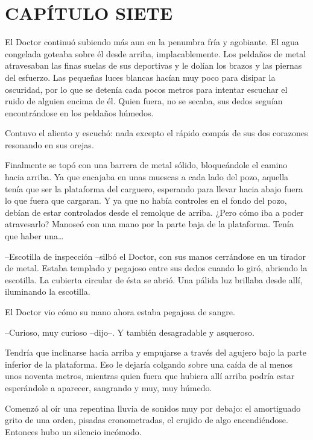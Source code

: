 \chapter*{CAPÍTULO SIETE}

{El Doctor continuó subiendo más aun en la penumbra fría y agobiante. El
 agua congelada goteaba sobre él desde arriba, implacablemente. Los
 peldaños de metal atravesaban las finas suelas de sus deportivas y le
 dolían los brazos y las piernas del esfuerzo. Las pequeñas luces blancas
 hacían muy poco para disipar la oscuridad, por lo que se detenía cada
 pocos metros para intentar escuchar el ruido de alguien encima de él.
 Quien fuera, no se secaba, sus dedos seguían encontrándose en los
peldaños húmedos.}

{Contuvo el aliento y escuchó: nada excepto el rápido compás de sus dos
corazones resonando en sus orejas.}

{Finalmente se topó con una barrera de metal sólido, bloqueándole el
 camino hacia arriba. Ya que encajaba en unas muescas a cada lado del
 pozo, aquella tenía que ser la plataforma del carguero, esperando para
 llevar hacia abajo fuera lo que fuera que cargaran. Y ya que no había
 controles en el fondo del pozo, debían de estar controlados desde el
 remolque de arriba. ¿Pero cómo iba a poder atravesarlo? Manoseó con una
 mano por la parte baja de la plataforma. Tenía que haber una\ldots{}}

{--Escotilla de inspección --silbó el Doctor, con sus manos cerrándose
 en un tirador de metal. Estaba templado y pegajoso entre sus dedos
 cuando lo giró, abriendo la escotilla. La cubierta circular de ésta se
abrió. Una pálida luz brillaba desde allí, iluminando la escotilla.}

{El Doctor vio cómo su mano ahora estaba pegajosa de sangre.}

{--Curioso, muy curioso --dijo--. Y también desagradable y asqueroso.}

{Tendría que inclinarse hacia arriba y empujarse a través del agujero
 bajo la parte inferior de la plataforma. Eso le dejaría colgando sobre
 una caída de al menos unos noventa metros, mientras quien fuera que
 hubiera allí arriba podría estar esperándole a aparecer, sangrando y
muy, muy húmedo.}

{Comenzó al oír una repentina lluvia de sonidos muy por debajo: el
 amortiguado grito de una orden, pisadas cronometradas, el crujido de
algo encendiéndose. Entonces hubo un silencio incómodo.}


